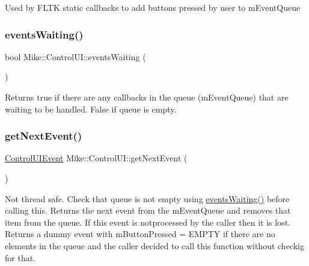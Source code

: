 Used by F\+L\+TK static callbacks to add buttons pressed by user to m\+Event\+Queue \mbox{\label{class_mike_1_1_control_u_i_afb11a656dc093a18fd3f12f9b9709418}} 
\subsubsection{\texorpdfstring{events\+Waiting()}{eventsWaiting()}}
{\footnotesize\ttfamily bool Mike\+::\+Control\+U\+I\+::events\+Waiting (\begin{DoxyParamCaption}{ }\end{DoxyParamCaption})\hspace{0.3cm}{\ttfamily [inline]}}

Returns true if there are any callbacks in the queue (m\+Event\+Queue) that are waiting to be handled. False if queue is empty. \mbox{\label{class_mike_1_1_control_u_i_ae5bb9cf35b75c37381573ce7469504f1}} 
\subsubsection{\texorpdfstring{get\+Next\+Event()}{getNextEvent()}}
{\footnotesize\ttfamily \hyperlink{struct_mike_1_1_control_u_i_event}{Control\+U\+I\+Event} Mike\+::\+Control\+U\+I\+::get\+Next\+Event (\begin{DoxyParamCaption}{ }\end{DoxyParamCaption})}

Not thread safe. Check that queue is not empty using \hyperlink{class_mike_1_1_control_u_i_afb11a656dc093a18fd3f12f9b9709418}{events\+Waiting()} before calling this. Returns the next event from the m\+Event\+Queue and removes that item from the queue. If this event is notprocessed by the caller then it is lost. Returns a dummy event with m\+Button\+Pressed = E\+M\+P\+TY if there are no elements in the queue and the caller decided to call this function without checkig for that. \mbox{\label{class_mike_1_1_control_u_i_ae37ce9f312e0f906a4847d6690927e27}} 
